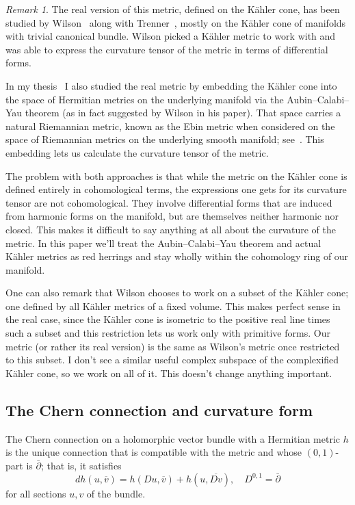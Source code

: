 \documentclass[11pt,a4paper]{amsart}
\theoremstyle{definition}
\theoremstyle{remark}
\newtheorem*{rema}{Remark}
\def\ov#1{\overline{#1}}
\def\dbar{\bar\partial}
\def\chern{D}
\def\ton{u}
\def\ttw{v}
\begin{document}
\begin{rema}
The real version of this metric, defined on the K\"{a}hler cone, has been
studied by Wilson~\cite{Wilson} along with Trenner~\cite{WilsonTrenner},
mostly on the K\"{a}hler cone of manifolds with trivial canonical bundle.
Wilson picked a K\"{a}hler metric to work with and was able to express the
curvature tensor of the metric in terms of differential forms.

In my thesis~\cite{Magnusson} I also studied the real metric by
embedding the K\"{a}hler cone into the space of Hermitian metrics on the
underlying manifold via the Aubin--Calabi--Yau theorem (as in fact
suggested by Wilson in his paper). That space carries a natural
Riemannian metric, known as the Ebin metric when considered on the space
of Riemannian metrics on the underlying smooth manifold;
see~\cite{Ebin,ClarkeRubinstein}. This embedding lets us calculate the
curvature tensor of the metric.

The problem with both approaches is that while the metric on the K\"{a}hler
cone is defined entirely in cohomological terms, the expressions one
gets for its curvature tensor are not cohomological. They involve
differential forms that are induced from harmonic forms on the manifold,
but are themselves neither harmonic nor closed. This makes it difficult
to say anything at all about the curvature of the metric. In this paper
we'll treat the Aubin--Calabi--Yau theorem and actual K\"{a}hler metrics as
red herrings and stay wholly within the cohomology ring of our manifold.

One can also remark that Wilson chooses to work on a subset of the
K\"{a}hler cone; one defined by all K\"{a}hler metrics of a fixed volume. This
makes perfect sense in the real case, since the K\"{a}hler cone is isometric
to the positive real line times such a subset and this restriction lets
us work only with primitive forms. Our metric (or rather its real version)
is the same as Wilson's metric once restricted to this subset.  I don't
see a similar useful complex subspace of the complexified K\"{a}hler cone, so
we work on all of it. This doesn't change anything important.
\end{rema}



\subsection{The Chern connection and curvature form}

The Chern connection on a holomorphic vector bundle with a Hermitian
metric $h$ is the unique connection that is compatible with the metric
and whose $(0,1)$-part is $\dbar$; that is, it satisfies
$$
d h(\ton, \ov{\ttw}) 
= h(\chern \ton, \ov{\ttw}) + h(\ton, \ov{\chern \ttw}),
\quad
\chern^{0,1} = \dbar
$$
for all sections $u, v$ of the bundle.
\end{document}
